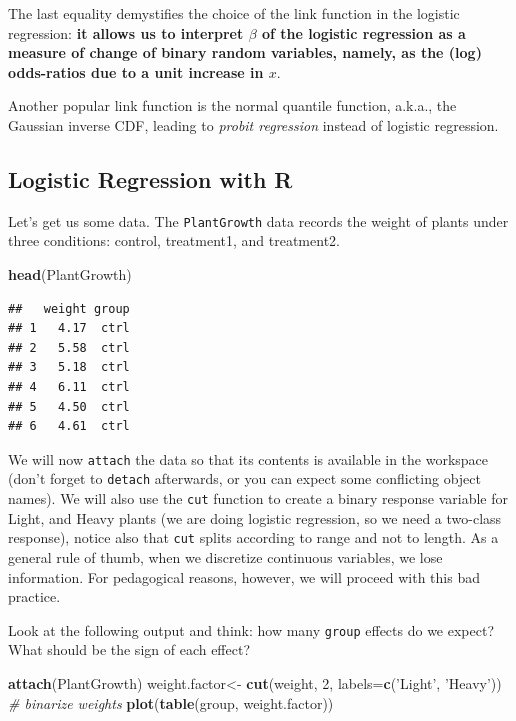 \documentclass[]{book}
\newenvironment{Shaded}{\begin{snugshade}}{\end{snugshade}}
\newcommand{\KeywordTok}[1]{\textcolor[rgb]{0.13,0.29,0.53}{\textbf{#1}}}
\newcommand{\DataTypeTok}[1]{\textcolor[rgb]{0.13,0.29,0.53}{#1}}
\newcommand{\DecValTok}[1]{\textcolor[rgb]{0.00,0.00,0.81}{#1}}
\newcommand{\StringTok}[1]{\textcolor[rgb]{0.31,0.60,0.02}{#1}}
\newcommand{\CommentTok}[1]{\textcolor[rgb]{0.56,0.35,0.01}{\textit{#1}}}
\newcommand{\NormalTok}[1]{#1}
\theoremstyle{definition}
\theoremstyle{definition}
\theoremstyle{definition}
\theoremstyle{remark}
\let\BeginKnitrBlock\begin \let\EndKnitrBlock\end
\begin{document}
The last equality demystifies the choice of the link function in the
logistic regression: \textbf{it allows us to interpret \(\beta\) of the
logistic regression as a measure of change of binary random variables,
namely, as the (log) odds-ratios due to a unit increase in \(x\)}.

\BeginKnitrBlock{remark}
{}Another popular link function is the normal
quantile function, a.k.a., the Gaussian inverse CDF, leading to
\emph{probit regression} instead of logistic regression.
\EndKnitrBlock{remark}

\subsection{Logistic Regression with
R}\label{logistic-regression-with-r}

Let's get us some data. The \texttt{PlantGrowth} data records the weight
of plants under three conditions: control, treatment1, and treatment2.

\begin{Shaded}
\begin{Highlighting}[]
\KeywordTok{head}\NormalTok{(PlantGrowth)}
\end{Highlighting}
\end{Shaded}

\begin{verbatim}
##   weight group
## 1   4.17  ctrl
## 2   5.58  ctrl
## 3   5.18  ctrl
## 4   6.11  ctrl
## 5   4.50  ctrl
## 6   4.61  ctrl
\end{verbatim}

We will now \texttt{attach} the data so that its contents is available
in the workspace (don't forget to \texttt{detach} afterwards, or you can
expect some conflicting object names). We will also use the \texttt{cut}
function to create a binary response variable for Light, and Heavy
plants (we are doing logistic regression, so we need a two-class
response), notice also that \texttt{cut} splits according to range and
not to length. As a general rule of thumb, when we discretize continuous
variables, we lose information. For pedagogical reasons, however, we
will proceed with this bad practice.

Look at the following output and think: how many \texttt{group} effects
do we expect? What should be the sign of each effect?

\begin{Shaded}
\begin{Highlighting}[]
\KeywordTok{attach}\NormalTok{(PlantGrowth)}
\NormalTok{weight.factor<-}\StringTok{ }\KeywordTok{cut}\NormalTok{(weight, }\DecValTok{2}\NormalTok{, }\DataTypeTok{labels=}\KeywordTok{c}\NormalTok{(}\StringTok{'Light'}\NormalTok{, }\StringTok{'Heavy'}\NormalTok{)) }\CommentTok{# binarize weights}
\KeywordTok{plot}\NormalTok{(}\KeywordTok{table}\NormalTok{(group, weight.factor))}
\end{Highlighting}
\end{Shaded}
\end{document}
